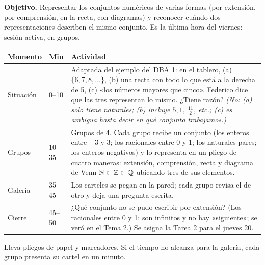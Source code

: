 \documentclass[11pt]{article}
\begin{document}
\textbf{Objetivo.} Representar los conjuntos numéricos de varias formas (por extensión, por
comprensión, en la recta, con diagramas) y reconocer cuándo dos representaciones describen
el mismo conjunto. Es la última hora del viernes: sesión activa, en grupos.

\begin{center}
{\renewcommand{\arraystretch}{1.3}
\begin{tabularx}{\linewidth}{@{}l l X@{}}
  \toprule
  \textbf{Momento} & \textbf{Min} & \textbf{Actividad}\\
  \midrule
  Situación & 0–10 & Adaptada del ejemplo del DBA 1: en el tablero,
    (a) $\{6, 7, 8, \ldots\}$, (b) una recta con todo lo que está a la derecha de 5,
    (c) «los números mayores que cinco». Federico dice que las tres representan lo mismo.
    ¿Tiene razón? \emph{(No: (a) solo tiene naturales; (b) incluye $5{,}1$, $\frac{11}{2}$,
    etc.; (c) es ambigua hasta decir en qué conjunto trabajamos.)}\\
  Grupos & 10–35 & Grupos de 4. Cada grupo recibe un conjunto (los enteros entre $-3$ y 3;
    los racionales entre 0 y 1; los naturales pares; los enteros negativos) y lo representa
    en un pliego de cuatro maneras: extensión, comprensión, recta y diagrama de Venn
    $\mathbb{N} \subset \mathbb{Z} \subset \mathbb{Q}$ ubicando tres de sus elementos.\\
  Galería & 35–45 & Los carteles se pegan en la pared; cada grupo revisa el de otro y deja
    una pregunta escrita.\\
  Cierre & 45–50 & ¿Qué conjunto no se pudo escribir por extensión? (Los racionales entre 0 y
    1: son infinitos y no hay «siguiente»; se verá en el Tema 2.) Se asigna la Tarea 2 para
    el jueves 20.\\
  \bottomrule
\end{tabularx}}
\end{center}

\begin{nota}
Lleva pliegos de papel y marcadores. Si el tiempo no alcanza para la galería, cada grupo
presenta su cartel en un minuto.
\end{nota}
\end{document}
